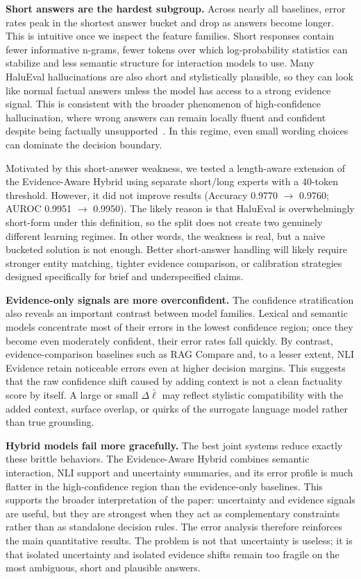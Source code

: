\documentclass[conference]{IEEEtran}
\begin{document}
\textbf{Short answers are the hardest subgroup.} Across nearly all baselines,
error rates peak in the shortest answer bucket and drop as answers become
longer. This is intuitive once we inspect the feature families. Short responses
contain fewer informative n-grams, fewer tokens over which log-probability
statistics can stabilize and less semantic structure for interaction models to
use. Many HaluEval hallucinations are also short and stylistically plausible,
so they can look like normal factual answers unless the model has access to a
strong evidence signal. This is consistent with the broader phenomenon of
high-confidence hallucination, where wrong answers can remain locally fluent and
confident despite being factually unsupported~\cite{zhang2023highcert}. In this
regime, even small wording choices can dominate the decision boundary.

Motivated by this short-answer weakness, we tested a length-aware extension
of the Evidence-Aware Hybrid using
separate short/long experts with a 40-token threshold. However, it did not
improve results (Accuracy 0.9770 $\rightarrow$ 0.9760; AUROC 0.9951
$\rightarrow$ 0.9950). The likely reason is that HaluEval is overwhelmingly
short-form under this definition, so the split does not create two genuinely
different learning regimes. In other words, the weakness is real, but a naive
bucketed solution is not enough. Better short-answer handling will likely
require stronger entity matching, tighter evidence comparison, or calibration
strategies designed specifically for brief and underspecified claims.

\textbf{Evidence-only signals are more overconfident.} The confidence
stratification also reveals an important contrast between model families.
Lexical and semantic models concentrate most of their errors in the lowest
confidence region; once they become even moderately confident, their error rates
fall quickly. By contrast, evidence-comparison baselines such as RAG Compare
and, to a lesser extent, NLI Evidence retain noticeable errors even at higher
decision margins. This suggests that the raw confidence shift caused by adding
context is not a clean factuality score by itself. A large or small
$\Delta\bar{\ell}$ may reflect stylistic compatibility with the added context,
surface overlap, or quirks of the surrogate language model rather than true
grounding.

\textbf{Hybrid models fail more gracefully.} The best joint systems reduce
exactly these brittle behaviors. The Evidence-Aware
Hybrid combines semantic interaction, NLI support and uncertainty summaries,
and its error profile is much flatter in the high-confidence region than the
evidence-only baselines. This supports the broader interpretation of the paper:
uncertainty and evidence signals are useful, but they are strongest when they
act as complementary constraints rather than as standalone decision rules. The
error analysis therefore reinforces the main quantitative results. The problem
is not that uncertainty is useless; it is that isolated uncertainty and
isolated evidence shifts remain too fragile on the most ambiguous, short and
plausible answers.
\end{document}
